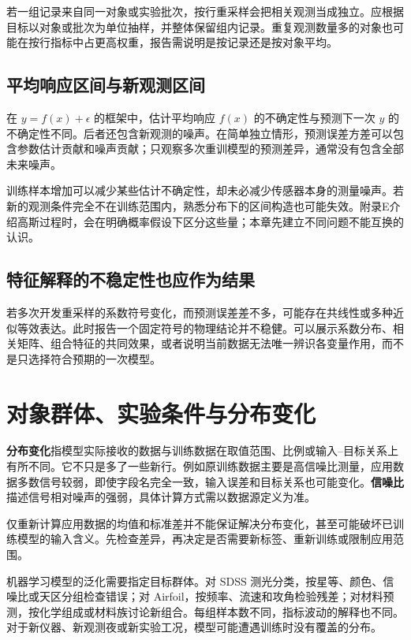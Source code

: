 若一组记录来自同一对象或实验批次，按行重采样会把相关观测当成独立。应根据目标以对象或批次为单位抽样，并整体保留组内记录。重复观测数量多的对象也可能在按行指标中占更高权重，报告需说明是按记录还是按对象平均。

\subsection{平均响应区间与新观测区间}
在 $y=f(x)+\epsilon$ 的框架中，估计平均响应 $f(x)$ 的不确定性与预测下一次 $y$ 的不确定性不同。后者还包含新观测的噪声。在简单独立情形，预测误差方差可以包含参数估计贡献和噪声贡献；只观察多次重训模型的预测差异，通常没有包含全部未来噪声。

训练样本增加可以减少某些估计不确定性，却未必减少传感器本身的测量噪声。若新的观测条件完全不在训练范围内，熟悉分布下的区间构造也可能失效。附录E介绍高斯过程时，会在明确概率假设下区分这些量；本章先建立不同问题不能互换的认识。

\subsection{特征解释的不稳定性也应作为结果}
若多次开发重采样的系数符号变化，而预测误差差不多，可能存在共线性或多种近似等效表达。此时报告一个固定符号的物理结论并不稳健。可以展示系数分布、相关矩阵、组合特征的共同效果，或者说明当前数据无法唯一辨识各变量作用，而不是只选择符合预期的一次模型。

\section{对象群体、实验条件与分布变化}

\textbf{分布变化}指模型实际接收的数据与训练数据在取值范围、比例或输入--目标关系上有所不同。它不只是多了一些新行。例如原训练数据主要是高信噪比测量，应用数据多数信号较弱，即使字段名完全一致，输入误差和目标关系也可能变化。\textbf{信噪比}描述信号相对噪声的强弱，具体计算方式需以数据源定义为准。

仅重新计算应用数据的均值和标准差并不能保证解决分布变化，甚至可能破坏已训练模型的输入含义。先检查差异，再决定是否需要新标签、重新训练或限制应用范围。

机器学习模型的泛化需要指定目标群体。对 SDSS 测光分类，按星等、颜色、信噪比或天区分组检查错误；对 Airfoil，按频率、流速和攻角检验残差；对材料预测，按化学组成或材料族讨论新组合。每组样本数不同，指标波动的解释也不同。对于新仪器、新观测夜或新实验工况，模型可能遭遇训练时没有覆盖的分布。



